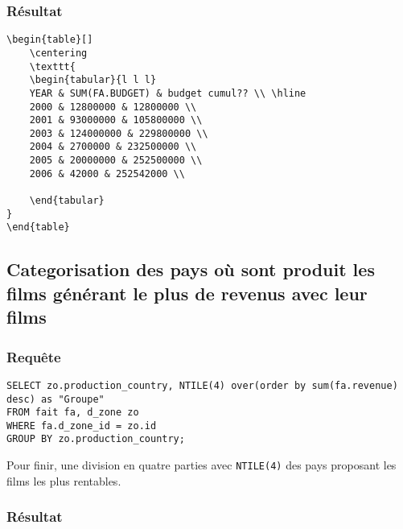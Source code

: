 \subsubsection{Résultat}
\begin{lstlisting}
\begin{table}[]
	\centering
	\texttt{
	\begin{tabular}{l l l}
	YEAR & SUM(FA.BUDGET) & budget cumul?? \\ \hline
	2000 & 12800000 & 12800000 \\
	2001 & 93000000 & 105800000 \\
	2003 & 124000000 & 229800000 \\
	2004 & 2700000 & 232500000 \\
	2005 & 20000000 & 252500000 \\
	2006 & 42000 & 252542000 \\

	\end{tabular}
}
\end{table}

\end{lstlisting}

\subsection{Categorisation des pays où sont produit les films générant le plus de revenus avec leur films}
\subsubsection{Requête}
\begin{lstlisting}
SELECT zo.production_country, NTILE(4) over(order by sum(fa.revenue) desc) as "Groupe"
FROM fait fa, d_zone zo
WHERE fa.d_zone_id = zo.id
GROUP BY zo.production_country;

\end{lstlisting}
Pour finir, une division en quatre parties avec \texttt{NTILE(4)} des pays proposant les films les plus rentables.
\subsubsection{Résultat}

